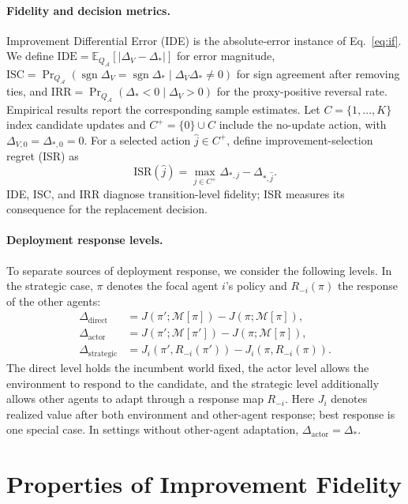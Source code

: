 \documentclass{article}
\newcommand{\E}{\mathbb{E}}
\newcommand{\M}{\mathcal{M}}
\newcommand{\pii}{\pi}
\newcommand{\pip}{\pi'}
\begin{document}
\paragraph{Fidelity and decision metrics.}
Improvement Differential Error (IDE) is the absolute-error instance of
Eq.~\eqref{eq:if}. We define
$\mathrm{IDE}=\E_{Q_{\mathcal A}}[|\Delta_V-\Delta_*|]$ for error magnitude,
$\mathrm{ISC}=\Pr_{Q_{\mathcal A}}(\operatorname{sgn}\Delta_V=
\operatorname{sgn}\Delta_*\mid\Delta_V\Delta_*\neq0)$ for sign agreement
after removing ties, and
$\mathrm{IRR}=\Pr_{Q_{\mathcal A}}(\Delta_*<0\mid\Delta_V>0)$ for the
proxy-positive reversal rate. Empirical results report the corresponding
sample estimates. Let $C=\{1,\ldots,K\}$ index candidate updates and
$C^+=\{0\}\cup C$ include the no-update action, with
$\Delta_{V,0}=\Delta_{*,0}=0$. For a selected action $\hat j\in C^+$, define
improvement-selection regret (ISR) as
\begin{equation}
  \mathrm{ISR}(\hat j)
  =
  \max_{j\in C^+}\Delta_{*,j}-\Delta_{*,\hat j}.
  \label{eq:isr}
\end{equation}
IDE, ISC, and IRR diagnose transition-level fidelity; ISR measures its
consequence for the replacement decision.

\paragraph{Deployment response levels.}
To separate sources of deployment response, we consider the following levels.
In the strategic case, $\pi$ denotes the focal agent $i$'s policy and
$R_{-i}(\pi)$ the response of the other agents:
\begin{align*}
  \Delta_{\mathrm{direct}}
  &=J(\pip;\M[\pii])-J(\pii;\M[\pii]),\\
  \Delta_{\mathrm{actor}}
  &=J(\pip;\M[\pip])-J(\pii;\M[\pii]),\\
  \Delta_{\mathrm{strategic}}
  &=J_i(\pip,R_{-i}(\pip))-J_i(\pii,R_{-i}(\pii)).
\end{align*}
The direct level holds the incumbent world fixed, the actor level allows the
environment to respond to the candidate, and the strategic level additionally
allows other agents to adapt through a response map $R_{-i}$. Here $J_i$
denotes realized value after both environment and other-agent response; best
response is one special case. In settings without other-agent adaptation,
$\Delta_{\mathrm{actor}}=\Delta_*$.


\section{Properties of Improvement Fidelity}
\end{document}
